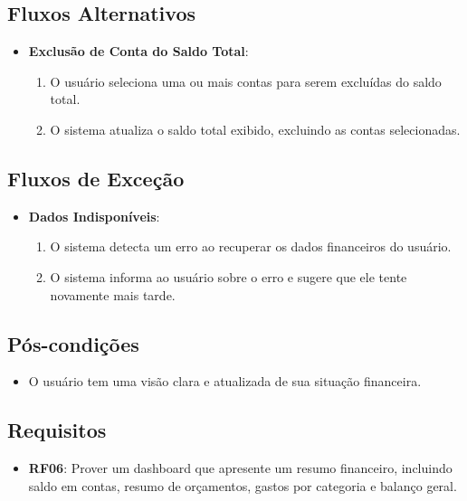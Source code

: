 \subsection*{Fluxos Alternativos}
\begin{addmargin}[1.5cm]{0cm}
    \begin{itemize}
        \item \textbf{Exclusão de Conta do Saldo Total}:
        \begin{enumerate}
            \item O usuário seleciona uma ou mais contas para serem excluídas do saldo total.
            \item O sistema atualiza o saldo total exibido, excluindo as contas selecionadas.
        \end{enumerate}
    \end{itemize}
\end{addmargin}

\subsection*{Fluxos de Exceção}
\begin{addmargin}[1.5cm]{0cm}
    \begin{itemize}
        \item \textbf{Dados Indisponíveis}:
        \begin{enumerate}
            \item O sistema detecta um erro ao recuperar os dados financeiros do usuário.
            \item O sistema informa ao usuário sobre o erro e sugere que ele tente novamente mais tarde.
        \end{enumerate}
    \end{itemize}
\end{addmargin}

\subsection*{Pós-condições}
\begin{addmargin}[1.5cm]{0cm}
    \begin{itemize}
        \item O usuário tem uma visão clara e atualizada de sua situação financeira.
    \end{itemize}
\end{addmargin}

\subsection*{Requisitos}
\begin{addmargin}[1.5cm]{0cm}
	\begin{itemize}
		\item \textbf{RF06}: Prover um dashboard que apresente um resumo financeiro, incluindo saldo em contas, resumo de orçamentos, gastos por categoria e balanço geral.            
	\end{itemize}
\end{addmargin}

